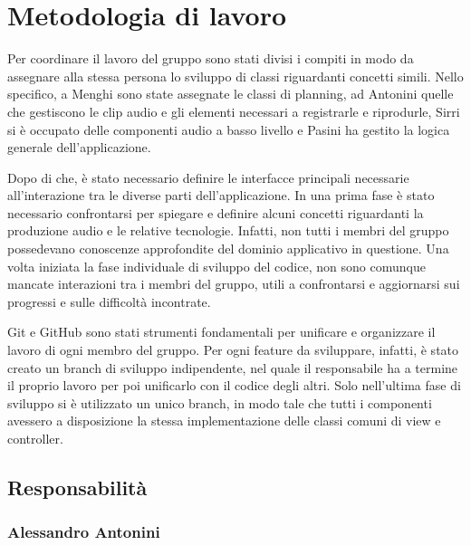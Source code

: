 \documentclass[a4paper,12pt]{report}
\begin{document}
\section{Metodologia di lavoro}
Per coordinare il lavoro del gruppo sono stati divisi i compiti in modo da assegnare alla stessa persona lo sviluppo di classi riguardanti concetti simili. Nello specifico, a Menghi sono state assegnate le classi di planning, ad Antonini quelle che gestiscono le clip audio e gli elementi necessari a registrarle e riprodurle, Sirri si è occupato delle componenti audio a basso livello e Pasini ha gestito la logica generale dell'applicazione.

Dopo di che, è stato necessario definire le interfacce principali necessarie all’interazione tra le diverse parti dell’applicazione.
In una prima fase è stato necessario confrontarsi per spiegare e definire alcuni concetti riguardanti la produzione audio e le relative tecnologie. Infatti, non tutti i membri del gruppo possedevano conoscenze approfondite del dominio applicativo in questione. 
Una volta iniziata la fase individuale di sviluppo del codice, non sono comunque mancate interazioni tra i membri del gruppo, utili a confrontarsi e aggiornarsi sui progressi e sulle difficoltà incontrate.

Git e GitHub sono stati strumenti fondamentali per unificare e organizzare il lavoro di ogni membro del gruppo. Per ogni feature da sviluppare, infatti, è stato creato un branch di sviluppo indipendente, nel quale il responsabile ha a termine il proprio lavoro per poi unificarlo con il codice degli altri. Solo nell'ultima fase di sviluppo si è utilizzato un unico branch, in modo tale che tutti i componenti avessero a disposizione la stessa implementazione delle classi comuni di view e controller.

\subsection{Responsabilità}
\subsubsection{Alessandro Antonini}
\end{document}
